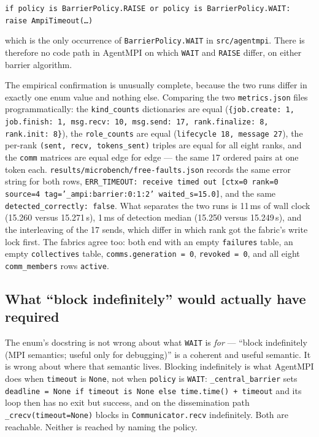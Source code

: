 \documentclass[11pt]{article}
\begin{document}
\begin{center}\texttt{if policy is BarrierPolicy.RAISE or policy is BarrierPolicy.WAIT: raise AmpiTimeout(\ldots)}\end{center}

\noindent which is the only occurrence of \texttt{BarrierPolicy.WAIT} in
\texttt{src/agentmpi}. There is therefore no code path in AgentMPI on which \texttt{WAIT}
and \texttt{RAISE} differ, on either barrier algorithm.

The empirical confirmation is unusually complete, because the two runs differ in exactly
one enum value and nothing else. Comparing the two \texttt{metrics.json} files
programmatically: the \texttt{kind\_counts} dictionaries are equal
(\texttt{\{job.create: 1, job.finish: 1, msg.recv: 10, msg.send: 17, rank.finalize: 8,
rank.init: 8\}}), the \texttt{role\_counts} are equal (\texttt{lifecycle 18, message 27}),
the per-rank \texttt{(sent, recv, tokens\_sent)} triples are equal for all eight ranks, and
the \texttt{comm} matrices are equal edge for edge --- the same 17 ordered pairs at one
token each. \texttt{results/microbench/free-faults.json} records the same error string for
both rows,
\texttt{ERR\_TIMEOUT: receive timed out [ctx=0 rank=0 source=4 tag='\_ampi:barrier:0:1:2'
waited\_s=15.0]}, and the same \texttt{detected\_correctly: false}. What separates the two
runs is 11\,ms of wall clock (15.260 versus 15.271\,s), 1\,ms of detection median (15.250
versus 15.249\,s), and the interleaving of the 17 sends, which differ in which rank got the
fabric's write lock first. The fabrics agree too: both end with an empty
\texttt{failures} table, an empty \texttt{collectives} table,
\texttt{comms.generation = 0}, \texttt{revoked = 0}, and all eight \texttt{comm\_members}
rows \texttt{active}.

\subsection{What ``block indefinitely'' would actually have required}

The enum's docstring is not wrong about what \texttt{WAIT} is \emph{for} --- ``block
indefinitely (MPI semantics; useful only for debugging)'' is a coherent and useful
semantic. It is wrong about where that semantic lives. Blocking indefinitely is what
AgentMPI does when \texttt{timeout} is \texttt{None}, not when \texttt{policy} is
\texttt{WAIT}: \texttt{\_central\_barrier} sets
\texttt{deadline = None if timeout is None else time.time() + timeout} and its loop then
has no exit but success, and on the dissemination path \texttt{\_crecv(timeout=None)}
blocks in \texttt{Communicator.recv} indefinitely. Both are reachable. Neither is reached
by naming the policy.
\end{document}
